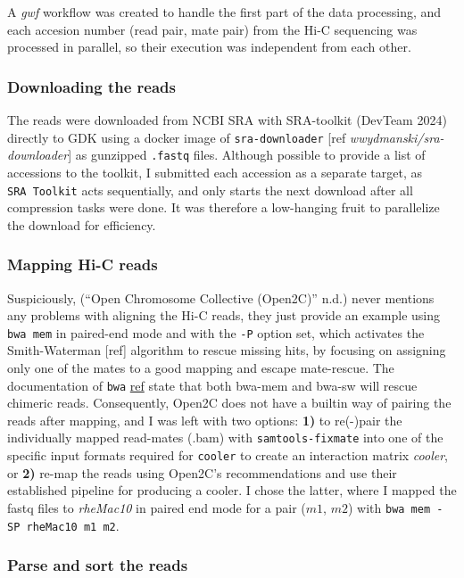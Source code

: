 \documentclass[
  11pt,
  a4paper,
]{scrbook}
\let\oldemph\emph
\renewcommand\emph[1]{\oldemph{\color{gray}#1}}
\begin{document}
A \emph{gwf} workflow was created to handle the first part of the data
processing, and each accesion number (read pair, mate pair) from the
Hi-C sequencing was processed in parallel, so their execution was
independent from each other.

\subsubsection{Downloading the reads}\label{downloading-the-reads}

The reads were downloaded from NCBI SRA with SRA-toolkit (DevTeam 2024)
directly to GDK using a docker image of \texttt{sra-downloader} {[}ref
\emph{wwydmanski/sra-downloader}{]} as gunzipped \texttt{.fastq} files.
Although possible to provide a list of accessions to the toolkit, I
submitted each accession as a separate target, as \texttt{SRA\ Toolkit}
acts sequentially, and only starts the next download after all
compression tasks were done. It was therefore a low-hanging fruit to
parallelize the download for efficiency.

\subsubsection{Mapping Hi-C reads}\label{mapping-hi-c-reads}

Suspiciously, ({``Open {Chromosome Collective} ({Open2C})''} n.d.) never
mentions any problems with aligning the Hi-C reads, they just provide an
example using \texttt{bwa\ mem} in paired-end mode and with the
\texttt{-P} option set, which activates the Smith-Waterman {[}ref{]}
algorithm to rescue missing hits, by focusing on assigning only one of
the mates to a good mapping and escape mate-rescue. The documentation of
\texttt{bwa} \href{https://bio-bwa.sourceforge.net}{ref} state that both
bwa-mem and bwa-sw will rescue chimeric reads. Consequently, Open2C does
not have a builtin way of pairing the reads after mapping, and I was
left with two options: \textbf{1)} to re(-)pair the individually mapped
read-mates (.bam) with \texttt{samtools-fixmate} into one of the
specific input formats required for \texttt{cooler} to create an
interaction matrix \emph{cooler}, or \textbf{2)} re-map the reads using
Open2C's recommendations and use their established pipeline for
producing a cooler. I chose the latter, where I mapped the fastq files
to \emph{rheMac10} in paired end mode for a pair (\(m1\), \(m2\)) with
\texttt{bwa\ mem\ -SP\ rheMac10\ m1\ m2}.

\subsubsection{Parse and sort the reads}\label{parse-and-sort-the-reads}
\end{document}
